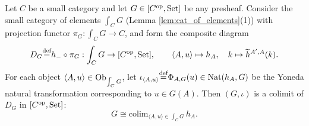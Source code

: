 \documentclass[10pt,a4paper]{article}
\begin{document}
\begin{theorem}\label{thm:density}
Let $C$ be a small category and let $G \in [C^{\textrm{op}}, {\textrm{Set}}]$ be any presheaf. Consider the small category of elements $\int_C G$ (Lemma \ref{lem:cat_of_elements}(1)) with projection functor $\pi_G : \int_C G \to C$, and form the composite diagram
$$D_G {\stackrel{{\textrm{def}}}{=}} h_- \circ \pi_G : \int_C G \to [C^{\textrm{op}}, {\textrm{Set}}], \qquad \langle A, u \rangle \mapsto h_A, \quad k \mapsto \widetilde{h}^{A',A}(k).$$
For each object $\langle A, u \rangle \in {\textrm{Ob}}_{\int_C G}$, let $\iota_{\langle A, u \rangle} {\stackrel{{\textrm{def}}}{=}} \Phi_{A,G}(u) \in {\textrm{Nat}}(h_A, G)$ be the Yoneda natural transformation corresponding to $u \in G(A)$. Then $(G, \iota)$ is a colimit of $D_G$ in $[C^{\textrm{op}}, {\textrm{Set}}]$:
$$G \cong \mathrm{colim}_{\langle A, u \rangle \in \int_C G}\, h_A.$$
\end{theorem}
\myprf
\end{document}
